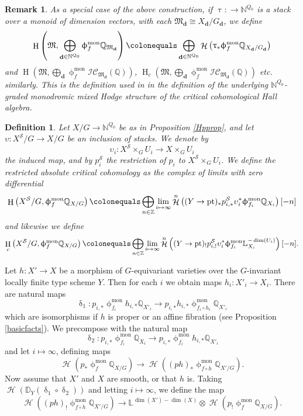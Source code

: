 \documentclass[a4paper,10pt]{amsart}
\renewcommand{\delta}{\updelta}
\renewcommand{\phi}{\upphi}
\renewcommand{\tau}{\uptau}
\newtheorem{definition}[theorem]{Definition}
\newtheorem{remark}[theorem]{Remark}
\newcommand{\DD}{\mathbb{D}}
\newcommand{\LL}{\mathbb{L}}
\newcommand{\QQ}{\mathbb{Q}}
\newcommand{\SP}{\mathcal{S}}
\newcommand{\Mst}{\mathfrak{M}}
\newcommand{\ICS}{\mathcal{IC}}
\newcommand{\phim}[1]{\phi^{\mon}_{#1}}
\DeclareMathOperator{\mon}{mon}
\DeclareMathOperator{\dd}{\mathbf{d}}
\DeclareMathOperator{\pt}{pt}
\DeclareMathOperator{\Ho}{\mathcal{H}}
\DeclareMathOperator{\HO}{H}
\begin{document}
\begin{remark}
\label{remAbs}
As a special case of the above construction, if $\tau\colon \rightarrow \mathbb{N}^{Q_0}$ is a stack over a monoid of dimension vectors, with each $\Mst_{\dd}\cong X_{\dd}/G_{\dd}$, we define
\begin{align*}
\HO\left(\Mst,\bigoplus_{\dd\in\mathbb{N}^{Q_0}}\phim{f}\QQ_{\Mst_{\dd}}\right)\colonequals \bigoplus_{\dd\in\mathbb{N}^{Q_0}}\Ho\left(\tau_*\phim{f}\QQ_{X_{\dd}/G_{\dd}}\right)
\end{align*}
and $\HO(\Mst,\bigoplus_{\dd}\phim{f}\ICS_{\Mst_{\dd}}(\mathbb{Q}))$, $\HO_c(\Mst,\bigoplus_{\dd}\phim{f}\ICS_{\Mst_{\dd}}(\mathbb{Q}))$ etc.\! similarly.  This is the definition used in \cite[Sec.7]{KS2} in the definition of the underlying $\mathbb{N}^{Q_0}$-graded monodromic mixed Hodge structure of the critical cohomological Hall algebra.
\end{remark}

\begin{definition}
Let $X/G\rightarrow\mathbb{N}^{Q_0}$ be as in Proposition \ref{Hpprop}, and let $\upsilon\colon X^{\SP}/G\rightarrow X/G$ be an inclusion of stacks.  We denote by 
\[
\upsilon_i\colon X^{\SP}\times_G U_i\rightarrow X\times_G U_i
\]
the induced map, and by $p^{\SP}_i$ the restriction of $p_i$ to $X^{\SP}\times_G U_i$.  We define the restricted absolute critical cohomology as the complex of limits with zero differential
\begin{equation}
\HO\left(X^{\SP}/G,\phim{f}\QQ_{X/G}\right)\colonequals \bigoplus_{n\in\mathbb{Z}}\lim_{i\mapsto\infty}\Ho^{n}\left((Y\rightarrow \pt)_*p^{\SP}_{i,*}\upsilon_i^*\phim{f_i}\mathbb{Q}_{X_i}\right)[-n]
\end{equation}
and likewise we define 
\begin{align*}
\HO_c\left(X^{\SP}/G,\phim{f}\QQ_{X/G}\right)\colonequals \bigoplus_{n\in\mathbb{Z}}\lim_{i\mapsto\infty}\Ho^{n}\left((Y\rightarrow \pt)_!p^{\SP}_{i,!}\upsilon_i^*\phim{f_i}\LL^{-\dim(U_i)}_{X_i}\right)[-n].
\end{align*}

\end{definition}


Let $h\colon X'\rightarrow X$ be a morphism of $G$-equivariant varieties over the $G$-invariant locally finite type scheme $Y$.  Then for each $i$ we obtain maps $h_i\colon X'_i\rightarrow X_i$.  There are natural maps 
\[
\delta_1\colon p_{i,*}\phim{f_i}h_{i,*}\mathbb{Q}_{X'_i}\rightarrow p_{i,*}h_{i,*}\phim{f_i\circ h_i}\mathbb{Q}_{X'_i}
\]
which are isomorphisms if $h$ is proper or an affine fibration (see Proposition \ref{basicfacts}).  We  precompose with the natural map
\[
\delta_2\colon p_{i,*}\phim{f_i}\mathbb{Q}_{X_i}\rightarrow p_{i,*}\phim{f_i}h_{i,*}\mathbb{Q}_{X'_i}
\]
and let $i\mapsto \infty$, defining maps 
\[
\Ho\left(p_*\phim{f}\mathbb{Q}_{X/G}\right)\rightarrow \Ho\left((p h)_*\phim{f\circ h}\mathbb{Q}_{X'/G}\right).  
\]
Now assume that $X'$ and $X$ are smooth, or that $h$ is.  Taking $\Ho(\DD_Y(\delta_1\circ \delta_2))$ and letting $i\mapsto\infty$, we define the map
\[
\Ho\left((p h)_!\phim{f\circ h}\mathbb{Q}_{X'/G}\right)\rightarrow\LL^{\dim(X')-\dim(X)}\otimes \Ho\left(p_!\phim{f}\mathbb{Q}_{X/G}\right).
\]
\end{document}
